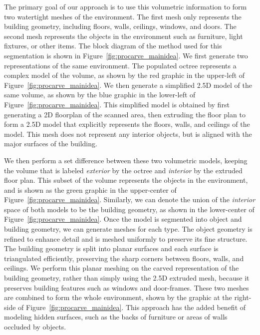 \documentclass[12pt,onecolumn,oneside]{book}
\begin{document}
The primary goal of our approach is to use this volumetric information to form two watertight meshes of the environment.  The first mesh only represents the building geometry, including floors, walls, ceilings, windows, and doors.  The second mesh represents the objects in the environment such as furniture, light fixtures, or other items.  The block diagram of the method used for this segmentation is shown in Figure~\ref{fig:procarve_mainidea}.  We first generate two representations of the same environment.  The populated octree represents a complex model of the volume, as shown by the red graphic in the upper-left of Figure~\ref{fig:procarve_mainidea}.  We then generate a simplified 2.5D model of the same volume, as shown by the blue graphic in the lower-left of Figure~\ref{fig:procarve_mainidea}.  This simplified model is obtained by first generating a 2D floorplan of the scanned area, then extruding the floor plan to form a 2.5D model that explicitly represents the floors, walls, and ceilings of the model.  This mesh does not represent any interior objects, but is aligned with the major surfaces of the building.

We then perform a set difference between these two volumetric models, keeping the volume that is labeled {\it exterior} by the octree and {\it interior} by the extruded floor plan.  This subset of the volume represents the objects in the environment, and is shown as the green graphic in the upper-center of Figure~\ref{fig:procarve_mainidea}.  Similarly, we can denote the union of the {\it interior} space of both models to be the building geometry, as shown in the lower-center of Figure~\ref{fig:procarve_mainidea}.  Once the model is segmented into object and building geometry, we can generate meshes for each type.  The object geometry is refined to enhance detail and is meshed uniformly to preserve its fine structure.  The building geometry is split into planar surfaces and each surface is triangulated efficiently, preserving the sharp corners between floors, walls, and ceilings.  We perform this planar meshing on the carved representation of the building geometry, rather than simply using the 2.5D extruded mesh, because it preserves building features such as windows and door-frames.  These two meshes are combined to form the whole environment, shown by the graphic at the right-side of Figure~\ref{fig:procarve_mainidea}.  This approach has the added benefit of modeling hidden surfaces, such as the backs of furniture or areas of walls occluded by objects.
\end{document}

